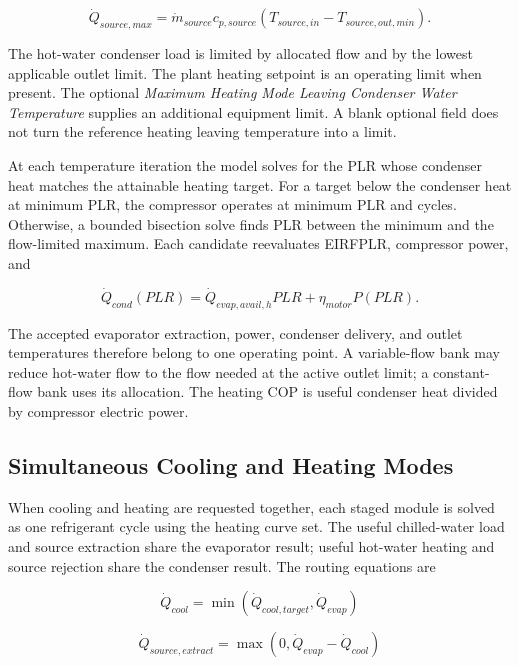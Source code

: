 \begin{equation}
\dot Q_{source,max}=\dot m_{source}c_{p,source}\left(T_{source,in}-T_{source,out,min}\right).
\end{equation}

The hot-water condenser load is limited by allocated flow and by the lowest applicable outlet limit. The plant heating setpoint is an operating limit when present. The optional \emph{Maximum Heating Mode Leaving Condenser Water Temperature} supplies an additional equipment limit. A blank optional field does not turn the reference heating leaving temperature into a limit.

At each temperature iteration the model solves for the PLR whose condenser heat matches the attainable heating target. For a target below the condenser heat at minimum PLR, the compressor operates at minimum PLR and cycles. Otherwise, a bounded bisection solve finds PLR between the minimum and the flow-limited maximum. Each candidate reevaluates EIRFPLR, compressor power, and

\begin{equation}
\dot Q_{cond}(PLR)=\dot Q_{evap,avail,h}PLR+\eta_{motor}P(PLR).
\end{equation}

The accepted evaporator extraction, power, condenser delivery, and outlet temperatures therefore belong to one operating point. A variable-flow bank may reduce hot-water flow to the flow needed at the active outlet limit; a constant-flow bank uses its allocation. The heating COP is useful condenser heat divided by compressor electric power.

\subsection{Simultaneous Cooling and Heating Modes}
\label{simultaneous-cooling-and-heating-modes}

When cooling and heating are requested together, each staged module is solved as one refrigerant cycle using the heating curve set. The useful chilled-water load and source extraction share the evaporator result; useful hot-water heating and source rejection share the condenser result. The routing equations are

\begin{equation}
\dot Q_{cool}=\min\left(\dot Q_{cool,target},\dot Q_{evap}\right)
\end{equation}

\begin{equation}
\dot Q_{source,extract}=\max\left(0,\dot Q_{evap}-\dot Q_{cool}\right)
\end{equation}

